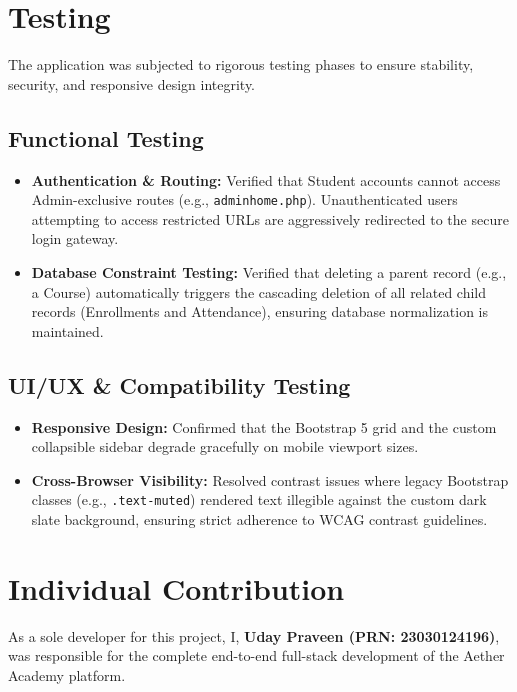 \documentclass[12pt, a4paper]{report}
\begin{document}
\chapter{Testing}
The application was subjected to rigorous testing phases to ensure stability, security, and responsive design integrity.

\section{Functional Testing}
\begin{itemize}
    \item \textbf{Authentication \& Routing:} Verified that Student accounts cannot access Admin-exclusive routes (e.g., \texttt{adminhome.php}). Unauthenticated users attempting to access restricted URLs are aggressively redirected to the secure login gateway.
    \item \textbf{Database Constraint Testing:} Verified that deleting a parent record (e.g., a Course) automatically triggers the cascading deletion of all related child records (Enrollments and Attendance), ensuring database normalization is maintained.
\end{itemize}

\section{UI/UX \& Compatibility Testing}
\begin{itemize}
    \item \textbf{Responsive Design:} Confirmed that the Bootstrap 5 grid and the custom collapsible sidebar degrade gracefully on mobile viewport sizes.
    \item \textbf{Cross-Browser Visibility:} Resolved contrast issues where legacy Bootstrap classes (e.g., \texttt{.text-muted}) rendered text illegible against the custom dark slate background, ensuring strict adherence to WCAG contrast guidelines.
\end{itemize}

\chapter{Individual Contribution}
As a sole developer for this project, I, \textbf{Uday Praveen (PRN: 23030124196)}, was responsible for the complete end-to-end full-stack development of the Aether Academy platform. 
\end{document}
